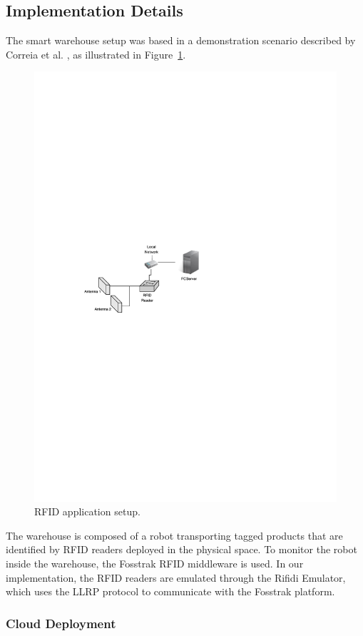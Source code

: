 \subsection{Implementation Details}
\label{sub:implementation}
The smart warehouse setup was based in a demonstration scenario described by Correia et al. \cite{correiaalpharfid},
as illustrated in Figure~\ref{fig:rfidapp_setup}.\\

\begin{figure}[ht!]
\centering
\includegraphics[width=.6\textwidth]{./images/rfidapp_setup}
\caption[RFID application setup.]{RFID application setup.}
\label{fig:rfidapp_setup}
\end{figure}

The warehouse is composed of a robot transporting tagged products that are identified by \gls{RFID} readers
deployed in the physical space. To monitor the robot inside the warehouse, the Fosstrak \gls{RFID} middleware
is used. In our implementation, the \gls{RFID} readers are emulated through the Rifidi Emulator, which uses
the \gls{LLRP} protocol to communicate with the Fosstrak platform.

\subsubsection{Cloud Deployment}
\label{subs:imp_smart_warehouse_cloud}

